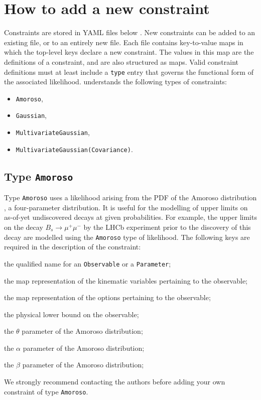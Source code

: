 \section{How to add a new constraint}

Constraints are stored in YAML files below . New constraints can be
added to an existing file, or to an entirely new file. Each file contains key-to-value maps
in which the top-level keys declare a new constraint.
The values in this map are the definitions of a constraint, and are also structured as maps. Valid
constraint definitions must at least include a \texttt{type} entry that governs the functional
form of the associated likelihood. \EOS understands the following types of constraints:
\begin{itemize}[labelwidth=.15\textwidth]
    \item \texttt{Amoroso},
    \item \texttt{Gaussian},
    \item \texttt{MultivariateGaussian},
    \item \texttt{MultivariateGaussian(Covariance)}.
\end{itemize}

\subsection{Type \texttt{Amoroso}}

Type \texttt{Amoroso} uses a likelihood arising from the \gls{PDF} of the
Amoroso distribution \cite{Crooks:2010}, a four-parameter distribution. It is
useful for the modelling of upper limits on as-of-yet undiscovered decays at
given probabilities. For example, the upper limits on the decay $B_s \to
\mu^+\mu^-$ by the LHCb experiment prior to the discovery of this decay are
modelled using the \texttt{Amoroso} type of likelihood. The following keys are
required in the description of the constraint:
\begin{description}[labelwidth=.15\textwidth]
    \item[\texttt{observable}] the qualified name for an \texttt{Observable} or a \texttt{Parameter};
    \item[\texttt{kinematics}] the map representation of the kinematic variables pertaining to the observable;
    \item[\texttt{options}] the map representation of the options pertaining to the observable;
    \item[\texttt{physical-limit}] the physical lower bound on the observable;
    \item[\texttt{theta}] the $\theta$ parameter of the Amoroso distribution;
    \item[\texttt{alpha}] the $\alpha$ parameter of the Amoroso distribution;
    \item[\texttt{beta}] the $\beta$ parameter of the Amoroso distribution;
\end{description}
We strongly recommend contacting the \EOS authors before adding your own constraint of type \texttt{Amoroso}.

